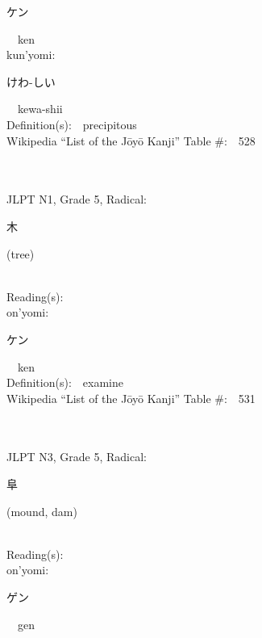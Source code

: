 \begin{multicols}{2}
{\hspace*{2em}}{\begin{CJK}{UTF8}{min} ケン \end{CJK}}\ \ ken\ \ \\
{\hspace*{1em}}kun'yomi:\ \ \\
{\hspace*{2em}}{\begin{CJK}{UTF8}{min} けわ-しい \end{CJK}}\ \ kewa-shii\ \ \\
Definition(s):\ \ precipitous \\
Wikipedia ``List of the J\=oy\=o Kanji'' Table \#:\ \ 528 \\
\ \ \\
{\fontsize{34pt}{40pt}  }\ \ \\  %
{JLPT N1, Grade 5, Radical:\ \ {\begin{CJK}{UTF8}{min} 木 \end{CJK}} (tree) } \\
Reading(s):\ \ \\
{\hspace*{1em}}on'yomi:\ \ \\
{\hspace*{2em}}{\begin{CJK}{UTF8}{min} ケン \end{CJK}}\ \ ken\ \ \\
Definition(s):\ \ examine \\
Wikipedia ``List of the J\=oy\=o Kanji'' Table \#:\ \ 531 \\
\ \ \\
{\fontsize{34pt}{40pt}  }\ \ \\  %
{JLPT N3, Grade 5, Radical:\ \ {\begin{CJK}{UTF8}{min} 阜 \end{CJK}} (mound, dam) } \\
Reading(s):\ \ \\
{\hspace*{1em}}on'yomi:\ \ \\
{\hspace*{2em}}{\begin{CJK}{UTF8}{min} ゲン \end{CJK}}\ \ gen\ \ \\

\end{multicols}
